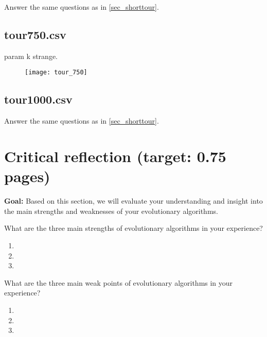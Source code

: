 \documentclass[a4paper,10pt]{article}
\newcommand{\ReplaceMe}[1]{{\color{blue}#1}}
\newcommand{\RemoveMe}[1]{{\color{purple}#1}}
\begin{document}
\ReplaceMe{Answer the same questions as in \cref{sec_shorttour}.}

\subsection{tour750.csv}
param k strange.
\begin{figure}
	\centering
	\texttt{[image: tour\_750]}
	\caption{}
	\label{fig:tour750}
\end{figure}


\subsection{tour1000.csv}

\ReplaceMe{Answer the same questions as in \cref{sec_shorttour}.}

\section{Critical reflection (target: 0.75 pages)}

\RemoveMe{\textbf{Goal:} Based on this section, we will evaluate your understanding and insight into the main strengths and weaknesses of your evolutionary algorithms.}

\ReplaceMe{What are the three main strengths of evolutionary algorithms in your experience?}

\begin{enumerate}
 \item 
 \item 
 \item 
\end{enumerate}

\ReplaceMe{What are the three main weak points of evolutionary algorithms in your experience?}

\begin{enumerate}
 \item 
 \item 
 \item 
\end{enumerate}
\end{document}
